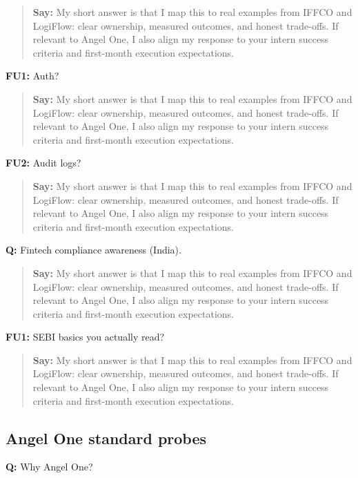 \documentclass[9pt,a4paper]{article}
\begin{document}
\begin{quote}\small\textbf{Say:} My short answer is that I map this to real examples from IFFCO and LogiFlow: clear ownership, measured outcomes, and honest trade-offs. If relevant to Angel One, I also align my response to your intern success criteria and first-month execution expectations.\end{quote}
\vspace{2mm}
\textbf{FU1:} Auth?

\begin{quote}\small\textbf{Say:} My short answer is that I map this to real examples from IFFCO and LogiFlow: clear ownership, measured outcomes, and honest trade-offs. If relevant to Angel One, I also align my response to your intern success criteria and first-month execution expectations.\end{quote}
\vspace{2mm}
\textbf{FU2:} Audit logs?

\begin{quote}\small\textbf{Say:} My short answer is that I map this to real examples from IFFCO and LogiFlow: clear ownership, measured outcomes, and honest trade-offs. If relevant to Angel One, I also align my response to your intern success criteria and first-month execution expectations.\end{quote}
\vspace{2mm}
\textbf{Q:} Fintech compliance awareness (India).

\begin{quote}\small\textbf{Say:} My short answer is that I map this to real examples from IFFCO and LogiFlow: clear ownership, measured outcomes, and honest trade-offs. If relevant to Angel One, I also align my response to your intern success criteria and first-month execution expectations.\end{quote}
\vspace{2mm}
\textbf{FU1:} SEBI basics you actually read?

\begin{quote}\small\textbf{Say:} My short answer is that I map this to real examples from IFFCO and LogiFlow: clear ownership, measured outcomes, and honest trade-offs. If relevant to Angel One, I also align my response to your intern success criteria and first-month execution expectations.\end{quote}
\vspace{2mm}
\subsection{Angel One standard probes}
\textbf{Q:} Why Angel One?
\end{document}
